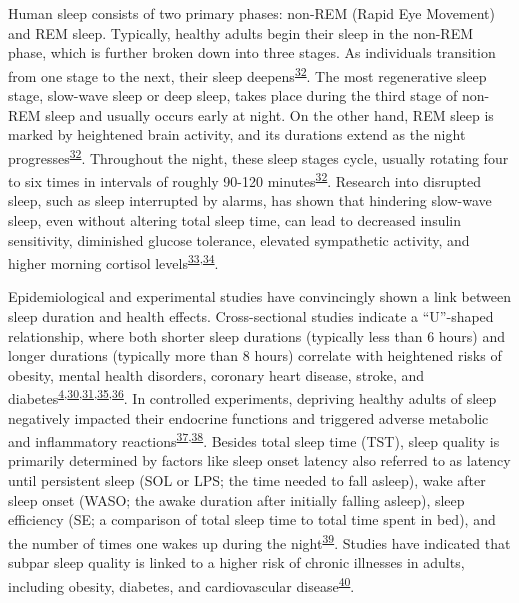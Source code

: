 \documentclass[
  10pt,
]{scrbook}
\begin{document}
Human sleep consists of two primary phases: non-REM (Rapid Eye Movement)
and REM sleep. Typically, healthy adults begin their sleep in the
non-REM phase, which is further broken down into three stages. As
individuals transition from one stage to the next, their sleep
deepens\textsuperscript{\protect\hyperlink{ref-roebuck_2014}{32}}. The
most regenerative sleep stage, slow-wave sleep or deep sleep, takes
place during the third stage of non-REM sleep and usually occurs early
at night. On the other hand, REM sleep is marked by heightened brain
activity, and its durations extend as the night
progresses\textsuperscript{\protect\hyperlink{ref-roebuck_2014}{32}}.
Throughout the night, these sleep stages cycle, usually rotating four to
six times in intervals of roughly 90-120
minutes\textsuperscript{\protect\hyperlink{ref-roebuck_2014}{32}}.
Research into disrupted sleep, such as sleep interrupted by alarms, has
shown that hindering slow-wave sleep, even without altering total sleep
time, can lead to decreased insulin sensitivity, diminished glucose
tolerance, elevated sympathetic activity, and higher morning cortisol
levels\textsuperscript{\protect\hyperlink{ref-stamatakis_2010}{33},\protect\hyperlink{ref-herzog_2013}{34}}.

Epidemiological and experimental studies have convincingly shown a link
between sleep duration and health effects. Cross-sectional studies
indicate a ``U''-shaped relationship, where both shorter sleep durations
(typically less than 6 hours) and longer durations (typically more than
8 hours) correlate with heightened risks of obesity, mental health
disorders, coronary heart disease, stroke, and
diabetes\textsuperscript{\protect\hyperlink{ref-cappuccio_sleep_2010}{4},\protect\hyperlink{ref-reutrakul_2018}{30},\protect\hyperlink{ref-jouxe3o_2018}{31},\protect\hyperlink{ref-cappuccio_2011}{35},\protect\hyperlink{ref-cappuccio_2008}{36}}.
In controlled experiments, depriving healthy adults of sleep negatively
impacted their endocrine functions and triggered adverse metabolic and
inflammatory
reactions\textsuperscript{\protect\hyperlink{ref-banks_2007}{37},\protect\hyperlink{ref-vancauter_2008}{38}}.
Besides total sleep time (TST), sleep quality is primarily determined by
factors like sleep onset latency also referred to as latency until
persistent sleep (SOL or LPS; the time needed to fall asleep), wake
after sleep onset (WASO; the awake duration after initially falling
asleep), sleep efficiency (SE; a comparison of total sleep time to total
time spent in bed), and the number of times one wakes up during the
night\textsuperscript{\protect\hyperlink{ref-buysse_2014}{39}}. Studies
have indicated that subpar sleep quality is linked to a higher risk of
chronic illnesses in adults, including obesity, diabetes, and
cardiovascular
disease\textsuperscript{\protect\hyperlink{ref-basnet_2016}{40}}.
\end{document}
